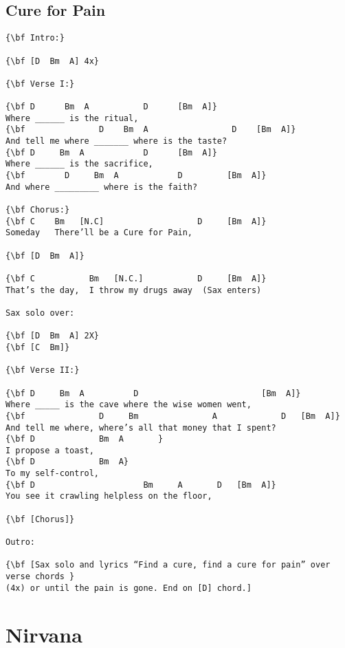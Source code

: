 \documentclass[a4paper]{article}
\begin{document}
\subsection{Cure for Pain} %
\label{sub:Cure for Pai}
\begin{Verbatim}[commandchars=\\\{\}]
{\bf Intro:}

{\bf [D  Bm  A] 4x}

{\bf Verse I:}

{\bf D      Bm  A           D      [Bm  A]}
Where ______ is the ritual,
{\bf               D    Bm  A                 D    [Bm  A]}
And tell me where _______ where is the taste?
{\bf D     Bm  A            D      [Bm  A]}
Where ______ is the sacrifice,
{\bf        D     Bm  A            D         [Bm  A]}
And where _________ where is the faith?

{\bf Chorus:}
{\bf C    Bm   [N.C]                   D     [Bm  A]}
Someday   There’ll be a Cure for Pain,

{\bf [D  Bm  A]}

{\bf C           Bm   [N.C.]           D     [Bm  A]}
That’s the day,  I throw my drugs away  (Sax enters)

Sax solo over:

{\bf [D  Bm  A] 2X}
{\bf [C  Bm]}

{\bf Verse II:}

{\bf D     Bm  A          D                         [Bm  A]}
Where _____ is the cave where the wise women went,
{\bf               D     Bm               A             D   [Bm  A]}
And tell me where, where’s all that money that I spent?
{\bf D             Bm  A       }
I propose a toast,
{\bf D             Bm  A}
To my self-control,
{\bf D                      Bm     A       D   [Bm  A]}
You see it crawling helpless on the floor,

{\bf [Chorus]}

Outro:

{\bf [Sax solo and lyrics “Find a cure, find a cure for pain” over verse chords }
(4x) or until the pain is gone. End on [D] chord.]
\end{Verbatim}
\newpage
\section{Nirvana} %
\label{sec:Nirv}
\end{document}
